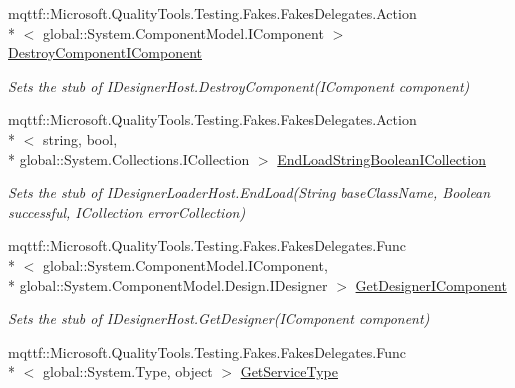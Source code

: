 \begin{DoxyCompactItemize}
\item 
mqttf\-::\-Microsoft.\-Quality\-Tools.\-Testing.\-Fakes.\-Fakes\-Delegates.\-Action\\*
$<$ global\-::\-System.\-Component\-Model.\-I\-Component $>$ \hyperlink{class_system_1_1_component_model_1_1_design_1_1_serialization_1_1_fakes_1_1_stub_i_designer_loader_host_a6050b371f0f1819f774e5e609275cdb7}{Destroy\-Component\-I\-Component}
\begin{DoxyCompactList}\small\item\em Sets the stub of I\-Designer\-Host.\-Destroy\-Component(\-I\-Component component)\end{DoxyCompactList}\item 
mqttf\-::\-Microsoft.\-Quality\-Tools.\-Testing.\-Fakes.\-Fakes\-Delegates.\-Action\\*
$<$ string, bool, \\*
global\-::\-System.\-Collections.\-I\-Collection $>$ \hyperlink{class_system_1_1_component_model_1_1_design_1_1_serialization_1_1_fakes_1_1_stub_i_designer_loader_host_a927721619f5fb84cfbf0b40bb77e9fae}{End\-Load\-String\-Boolean\-I\-Collection}
\begin{DoxyCompactList}\small\item\em Sets the stub of I\-Designer\-Loader\-Host.\-End\-Load(\-String base\-Class\-Name, Boolean successful, I\-Collection error\-Collection)\end{DoxyCompactList}\item 
mqttf\-::\-Microsoft.\-Quality\-Tools.\-Testing.\-Fakes.\-Fakes\-Delegates.\-Func\\*
$<$ global\-::\-System.\-Component\-Model.\-I\-Component, \\*
global\-::\-System.\-Component\-Model.\-Design.\-I\-Designer $>$ \hyperlink{class_system_1_1_component_model_1_1_design_1_1_serialization_1_1_fakes_1_1_stub_i_designer_loader_host_ae40737e678e280e7b5afd797e1e689d8}{Get\-Designer\-I\-Component}
\begin{DoxyCompactList}\small\item\em Sets the stub of I\-Designer\-Host.\-Get\-Designer(\-I\-Component component)\end{DoxyCompactList}\item 
mqttf\-::\-Microsoft.\-Quality\-Tools.\-Testing.\-Fakes.\-Fakes\-Delegates.\-Func\\*
$<$ global\-::\-System.\-Type, object $>$ \hyperlink{class_system_1_1_component_model_1_1_design_1_1_serialization_1_1_fakes_1_1_stub_i_designer_loader_host_aa8f3dc4d95c63367722b01ccbbbcff1d}{Get\-Service\-Type}

\end{DoxyCompactItemize}
